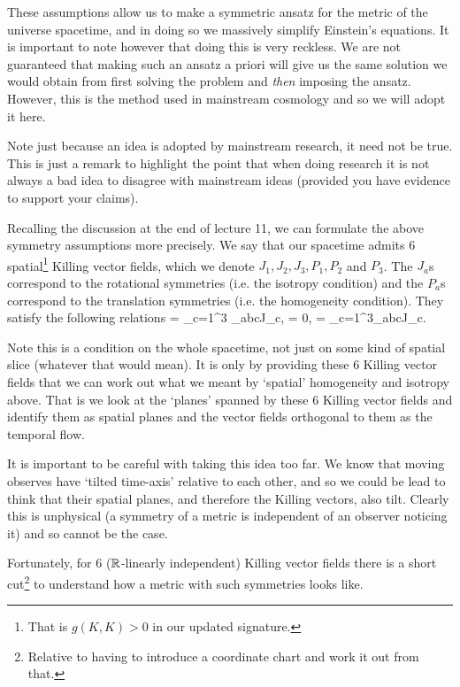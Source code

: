 These assumptions allow us to make a symmetric ansatz for the metric of the universe spacetime, and in doing so we massively simplify Einstein's equations. It is important to note however that doing this is very reckless. We are not guaranteed that making such an ansatz a priori will give us the same solution we would obtain from first solving the problem and \textit{then} imposing the ansatz. However, this is the method used in mainstream cosmology and so we will adopt it here. 

\br 
    Note just because an idea is adopted by mainstream research, it need not be true. This is just a remark to highlight the point that when doing research it is not always a bad idea to disagree with mainstream ideas (provided you have evidence to support your claims). 
\er 

Recalling the discussion at the end of lecture 11, we can formulate the above symmetry assumptions more precisely. We say that our spacetime admits 6 spatial\footnote{That is $g(K,K)>0$ in our updated signature.} Killing vector fields, which we denote $J_1,J_2,J_3, P_1,P_2$ and $P_3$. The $J_a$s correspond to the rotational symmetries (i.e. the isotropy condition) and the $P_a$s correspond to the translation symmetries (i.e. the homogeneity condition). They satisfy the following relations 
\bse 
    [J_a,J_b] = \sum_{c=1}^3 \epsilon_{abc}J_c, \qquad [P_a,P_b] = 0, \qand [J_a,P_b] = \sum_{c=1}^3\epsilon_{abc}J_c.
\ese 

\br 
    Note this is a condition on the whole spacetime, not just on some kind of spatial slice (whatever that would mean). It is only by providing these 6 Killing vector fields that we can work out what we meant by `spatial' homogeneity and isotropy above. That is we look at the `planes' spanned by these 6 Killing vector fields and identify them as spatial planes and the vector fields orthogonal to them as the temporal flow. 
    
    It is important to be careful with taking this idea too far. We know that moving observes have `tilted time-axis' relative to each other, and so we could be lead to think that their spatial planes, and therefore the Killing vectors, also tilt. Clearly this is unphysical (a symmetry of a metric is independent of an observer noticing it) and so cannot be the case. 
\er 

Fortunately, for 6 ($\mathbb{R}$-linearly independent) Killing vector fields there is a short cut\footnote{Relative to having to introduce a coordinate chart and work it out from that.} to understand how a metric with such symmetries looks like. 

